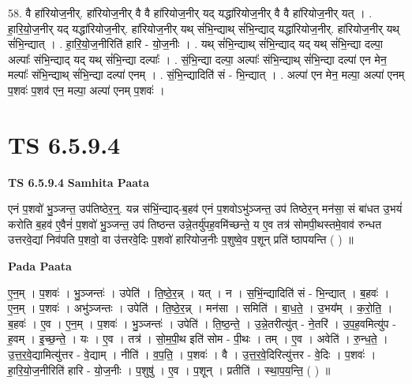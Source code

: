 \documentclass[17pt]{extarticle}
\begin{document}
58. वै हा॑रियोज॒नीर्. हा॑रियोज॒नीर् वै वै हा॑रियोज॒नीर् यद् यद्धा॑रियोज॒नीर् वै वै हा॑रियोज॒नीर् यत् । . हा॒रि॒यो॒ज॒नीर् यद् यद्धा॑रियोज॒नीर्. हा॑रियोज॒नीर् यथ् सं॑भि॒न्द्याथ् सं॑भि॒न्द्याद् यद्धा॑रियोज॒नीर्. हा॑रियोज॒नीर् यथ् सं॑भि॒न्द्यात् । . हा॒रि॒यो॒ज॒नीरिति॑ हारि - यो॒ज॒नीः । . यथ् सं॑भि॒न्द्याथ् सं॑भि॒न्द्याद् यद् यथ् सं॑भि॒न्द्या दल्पा॒ अल्पाः᳚ संभि॒न्द्याद् यद् यथ् सं॑भि॒न्द्या दल्पाः᳚ । . सं॒भि॒न्द्या दल्पा॒ अल्पाः᳚ संभि॒न्द्याथ् सं॑भि॒न्द्या दल्पा॑ एन मेन॒ मल्पाः᳚ संभि॒न्द्याथ् सं॑भि॒न्द्या दल्पा॑ एनम् । . सं॒भि॒न्द्यादिति॑ सं - भि॒न्द्यात् । . अल्पा॑ एन मेन॒ मल्पा॒ अल्पा॑ एनम् प॒शवः॑ प॒शव॑ एन॒ मल्पा॒ अल्पा॑ एनम् प॒शवः॑ । \newline
\pagebreak
{}

\section{ TS 6.5.9.4 }

\textbf{TS 6.5.9.4 } \newline
\textbf{Samhita Paata} \newline

एनं प॒शवो॑ भु॒ञ्जन्त॒ उप॑तिष्ठेर॒न्॒. यन्न स॑भिं॒न्द्याद्-ब॒हव॑ एनं प॒शवोऽभु॑ञ्जन्त॒ उप॑ तिष्ठेर॒न् मन॑सा॒ सं बा॑धत उ॒भयं॑ करोति ब॒हव॑ ए॒वैनं॑ प॒शवो॑ भु॒ञ्जन्त॒ उप॑ तिष्ठन्त उन्ने॒तर्यु॑पह॒वमि॑च्छन्ते॒ य ए॒व तत्र॑ सोमपी॒थस्तमे॒वाव॑ रुन्धत उत्तरवे॒द्यां निव॑पति प॒शवो॒ वा उ॑त्तरवे॒दिः प॒शवो॑ हारियोज॒नीः प॒शुष्वे॒व प॒शून् प्रति॑ ष्ठापयन्ति ( ) ॥ \newline

\textbf{Pada Paata} \newline

ए॒न॒म् । प॒शवः॑ । भु॒ञ्जन्तः॑ । उपेति॑ । ति॒ष्ठे॒र॒न्न् । यत् । न । स॒भिं॒न्द्यादिति॑ सं - भि॒न्द्यात् । ब॒हवः॑ । ए॒न॒म् । प॒शवः॑ । अभु॑ञ्जन्तः । उपेति॑ । ति॒ष्ठे॒र॒न्न् । मन॑सा । समिति॑ । बा॒ध॒ते॒ । उ॒भय᳚म् । क॒रो॒ति॒ । ब॒हवः॑ । ए॒व । ए॒न॒म् । प॒शवः॑ । भु॒ञ्जन्तः॑ । उपेति॑ । ति॒ष्ठ॒न्ते॒ । उ॒न्ने॒तरीत्यु॑त् - ने॒तरि॑ । उ॒प॒ह॒वमित्यु॑प - ह॒वम् । इ॒च्छ॒न्ते॒ । यः । ए॒व । तत्र॑ । सो॒म॒पी॒थ इति॑ सोम - पी॒थः । तम् । ए॒व । अवेति॑ । रु॒न्ध॒ते॒ । उ॒त्त॒र॒वे॒द्यामित्यु॑त्तर - वे॒द्याम् । नीति॑ । व॒प॒ति॒ । प॒शवः॑ । वै । उ॒त्त॒र॒वे॒दिरित्यु॑त्तर - वे॒दिः । प॒शवः॑ । हा॒रि॒यो॒ज॒नीरिति॑ हारि - यो॒ज॒नीः । प॒शुषु॑ । ए॒व । प॒शून् । प्रतीति॑ । स्था॒प॒य॒न्ति॒ ( ) ॥  \newline
\end{document}
